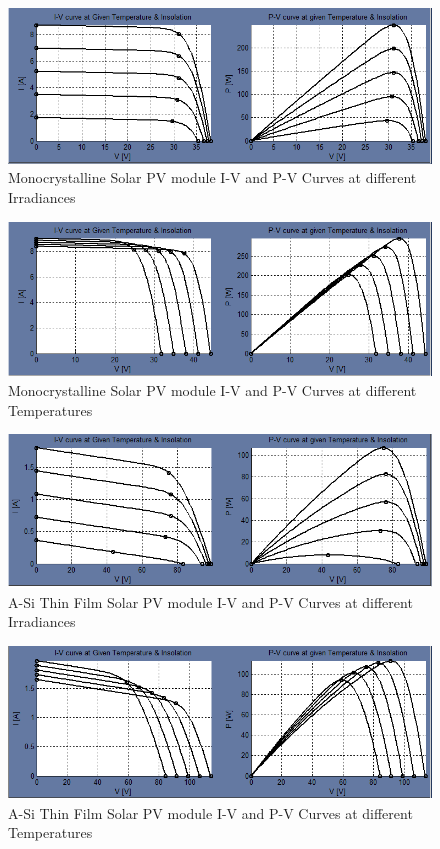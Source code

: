 \documentclass[12pt]{article}
\begin{document}
\begin{figure}[H]
\centering
\includegraphics[scale=0.5]{Mono_Irradiance}
\caption{Monocrystalline Solar PV module I-V and P-V Curves at different Irradiances}
\label{figc3h17} %
\end{figure}

\begin{figure}[H]
\centering
\includegraphics[scale=0.5]{Mono_Temperature}
\caption{Monocrystalline Solar PV module I-V and P-V Curves at different Temperatures}
\label{figc3h18} %
\end{figure}

\begin{figure}[H]
\centering
\includegraphics[scale=0.5]{A-si_Irradiance}
\caption{A-Si Thin Film Solar PV module I-V and P-V Curves at different Irradiances}
\label{figc3h19} %
\end{figure}

\begin{figure}[H]
\centering
\includegraphics[scale=0.5]{A-si_Temperature}
\caption{A-Si Thin Film Solar PV module I-V and P-V Curves at different Temperatures}
\label{figc3h20} %
\end{figure}
\end{document}

